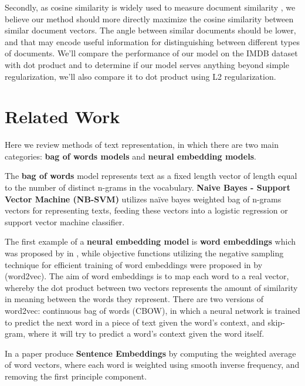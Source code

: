 \documentclass[11pt,a4paper]{article}
\begin{document}
Secondly, as cosine similarity is widely used to measure document similarity \cite{singhal2001,dai2015}, we believe our
method should more directly maximize the cosine similarity between similar document vectors. The angle
between similar documents should be lower, and that may encode useful information for distinguishing
between different types of documents. We'll compare the performance of our model on the IMDB dataset \cite{maas2011} with
dot product and to determine if our model serves anything beyond simple regularization, we'll also compare
it to dot product using L2 regularization. 

\section{Related Work}


Here we review methods of text representation, in which there are two main categories: \textbf{bag of words models} and \textbf{neural embedding models}. 

The \textbf{bag of words} model \cite{joachims1998} represents text as a fixed length vector of length equal to the number of distinct n-grams in the vocabulary.   
\textbf{Naive Bayes - Support Vector Machine (NB-SVM)} \cite{wang2012} utilizes naïve bayes weighted bag of n-grams vectors for representing texts, feeding these vectors into a logistic regression or support vector machine classifier. 

The first example of a \textbf{neural embedding model} is 
\textbf{word embeddings} which was proposed by \citeauthor{bengio2003} in \citeyear{bengio2003}, while objective functions utilizing the negative sampling technique for efficient training of word embeddings were proposed in \citeyear{mikolov2013} by \citeauthor{mikolov2013} (word2vec). The aim of word embeddings is to map each word to a real vector, whereby the dot product between two vectors represents the amount of similarity in meaning between the words they represent.  
There are two versions of word2vec: continuous bag of words (CBOW), in which a neural network is trained to predict the next word in a piece of text given the word’s context, and skip-gram, where it will try to predict a word’s context given the word itself. 

In a \citeyear{arora2017} paper \citeauthor{arora2017} produce \textbf{Sentence Embeddings} by computing the weighted average of word vectors, where each word is weighted using smooth inverse frequency, and removing the first principle component. 
\end{document}
